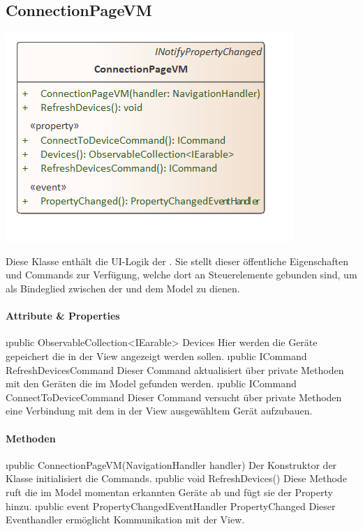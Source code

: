 \documentclass[../entwurf.tex]{subfiles}
\begin{document}
\subsection{ConnectionPageVM}
\begin{minipage}{0.5\textwidth}
\includegraphics[scale=0.75]{../graphics/vm_klassen/ConnectionPageVM.png}
\end{minipage}
\begin{minipage}{0.5\textwidth}
Diese Klasse enthält die UI-Logik der . Sie stellt dieser öffentliche Eigenschaften und Commands zur Verfügung, welche dort an Steuerelemente gebunden sind, um als Bindeglied zwischen der  und dem Model zu dienen.
\end{minipage}
\paragraph{Attribute \& Properties}
\begin{itemize}
	\i{public ObservableCollection<IEarable> Devices} Hier werden die Geräte gepeichert die in der View angezeigt werden sollen.
	\i{public ICommand RefreshDevicesCommand} Dieser Command aktualisiert über private Methoden  mit den Geräten die im Model gefunden werden. 
	\i{public ICommand ConnectToDeviceCommand} Dieser Command versucht über private Methoden eine Verbindung mit dem in der View ausgewähltem Gerät aufzubauen. 
\end{itemize}
\paragraph{Methoden}
\begin{itemize}
	\i{public ConnectionPageVM(NavigationHandler handler)} Der Konstruktor der Klasse initialisiert die Commands.
	\i{public void RefreshDevices()} Diese Methode ruft die im Model momentan erkannten Geräte ab und fügt sie der Property  hinzu.
	\i{public event PropertyChangedEventHandler PropertyChanged} Dieser Eventhandler ermöglicht Kommunikation mit der View.
\end{itemize}
\end{document}
